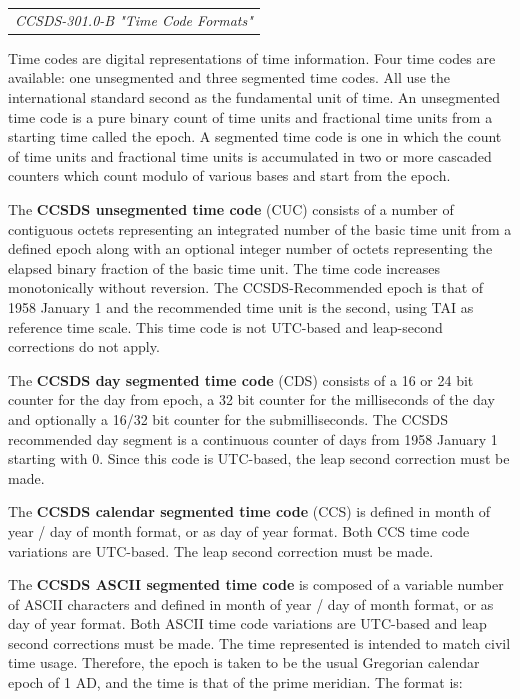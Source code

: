 \begin{tabular}{l}
\textit{CCSDS-301.0-B "Time Code Formats" \cite{CCSDS-301.0-B}} \\
\end{tabular}

Time codes are digital representations of time information. Four time codes are available: one unsegmented and three segmented time codes. All use the international standard second as the fundamental unit of time. An unsegmented time code is a pure binary count of time units and fractional time units from a starting time called the epoch. A segmented time code is one in which the count of time units and fractional time units is accumulated in two or more cascaded counters which count modulo of various bases and start from the epoch. 

The \textbf{CCSDS unsegmented time code} (CUC) consists of a number of contiguous octets representing an integrated  number of the basic time unit from a defined epoch along with an optional integer number of octets representing the elapsed binary fraction of the basic time unit. The time code increases monotonically without reversion. The CCSDS-Recommended epoch is that of 1958 January 1 and the recommended time unit is the second, using TAI as reference time scale. This time code is not UTC-based and leap-second corrections do not apply. 

The \textbf{CCSDS day segmented time code} (CDS) consists of a 16 or 24 bit counter for the day from epoch, a 32 bit counter for the milliseconds of the day and optionally a 16/32 bit counter for the submilliseconds. The CCSDS recommended day segment is a continuous counter of days from 1958 January 1 starting with 0. Since this code is UTC-based, the leap second correction must be made. 

The \textbf{CCSDS calendar segmented time code} (CCS) is defined in month of year / day of month format, or as day of year format. Both CCS time code variations are UTC-based. The leap second correction must be made.

The \textbf{CCSDS ASCII segmented  time code} is composed of a variable number of ASCII 
characters and defined in month of year / day of month format, or as day of year format. Both ASCII time code variations are UTC-based and leap second corrections must be made. The time represented is intended to match civil time usage.  Therefore, the epoch is taken to be the usual Gregorian calendar epoch of 1 AD, and the time is that of the prime meridian. The format is:

